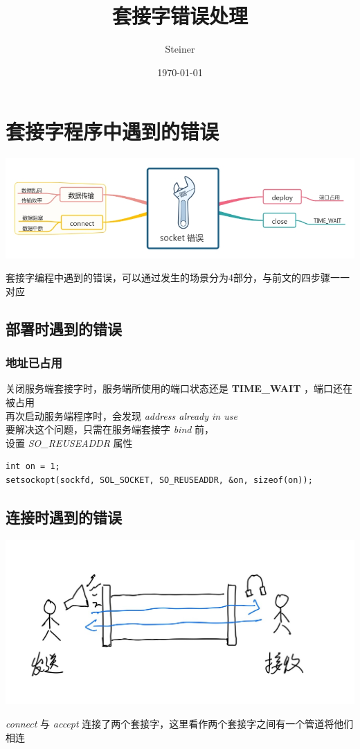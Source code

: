 \documentclass[11pt]{article}
\author{Steiner}
\date{\today}
\title{套接字错误处理}
\begin{document}
\maketitle
\tableofcontents


\section{套接字程序中遇到的错误}
\label{sec:org80e9d22}
\begin{center}
\includegraphics[width=.9\linewidth]{./images/socket-debug.jpg}
\end{center}

套接字编程中遇到的错误，可以通过发生的场景分为4部分，与前文的四步骤一一对应\\
\subsection{部署时遇到的错误}
\label{sec:org054ed6a}
\subsubsection{地址已占用}
\label{sec:orgd43f1cc}
关闭服务端套接字时，服务端所使用的端口状态还是 \textbf{TIME\_WAIT} ，端口还在被占用\\
再次启动服务端程序时，会发现 \emph{address already in use}\\

要解决这个问题，只需在服务端套接字 \emph{bind} 前，\\
设置 \emph{SO\_REUSEADDR} 属性\\
\begin{verbatim}
int on = 1;
setsockopt(sockfd, SOL_SOCKET, SO_REUSEADDR, &on, sizeof(on));
\end{verbatim}
\subsection{连接时遇到的错误}
\label{sec:orgfc67767}
\begin{center}
\includegraphics[width=.9\linewidth]{./images/socket.jpg}
\end{center}
\emph{connect} 与 \emph{accept} 连接了两个套接字，这里看作两个套接字之间有一个管道将他们相连\\
\end{document}
